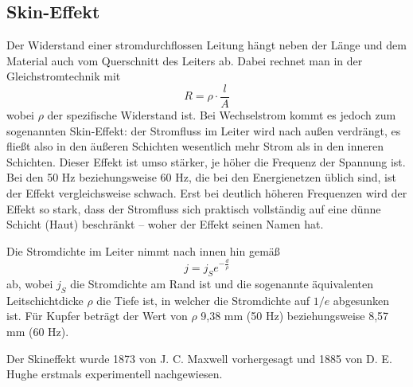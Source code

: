 
\subsection{Skin-Effekt}
Der Widerstand einer stromdurchflossen Leitung hängt neben der Länge und dem Material auch vom Querschnitt des Leiters ab. Dabei rechnet man in der Gleichstromtechnik mit
\begin{equation}
R = \rho \cdot \frac{l}{A}
\end{equation}
wobei $\rho$ der spezifische Widerstand ist. Bei Wechselstrom kommt es jedoch zum sogenannten Skin-Effekt: der Stromfluss im Leiter wird nach außen verdrängt, es fließt also in den äußeren Schichten wesentlich mehr Strom als in den inneren Schichten. Dieser Effekt ist umso stärker, je höher die Frequenz der Spannung ist. Bei den 50 Hz beziehungsweise 60 Hz, die bei den Energienetzen üblich sind, ist der Effekt vergleichsweise schwach.
Erst bei deutlich höheren Frequenzen wird der Effekt so stark, dass der Stromfluss sich praktisch vollständig auf eine dünne Schicht (Haut) beschränkt -- woher der Effekt seinen Namen hat.

Die Stromdichte im Leiter nimmt nach innen hin gemäß
\begin{equation}
j = j_S e^{-\frac{d}{\rho}}
\end{equation}
ab, wobei $j_S$ die Stromdichte am Rand ist und die sogenannte äquivalenten Leitschichtdicke $\rho$ die Tiefe ist, in welcher die Stromdichte auf $1/e$ abgesunken ist. Für Kupfer beträgt der Wert von $\rho$ 9,38 mm (50 Hz) beziehungsweise 8,57 mm (60 Hz). %

Der Skineffekt wurde 1873 von J. C. Maxwell vorhergesagt und 1885 von D. E. Hughe erstmals experimentell nachgewiesen\cite{BergmannSchaefer}.

